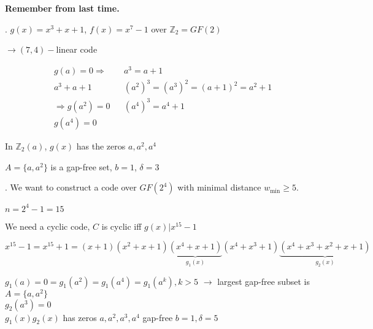 

\textbf{Remember from last time.}

\Example.
$g(x) = x^3 +x+1$, $f(x) = x^7-1$ over $\mathbb{Z}_2 = GF(2)$

$\to (7,4)-$linear code

\begin{align*}
  &g(a) = 0 \Rightarrow && a^3= a+1\\
  &a^3+a+1              &&(a^2)^3 = (a^3)^2 = (a+1)^2 = a^2+1\\
  &\Rightarrow g(a^2) = 0  && (a^4)^3 = a^4+1\\
  &g(a^4)=0
\end{align*}

In $\mathbb{Z}_2(a)$, $g(x)$ has the zeros $a,a^2,a^4$

$A = \{a,a^2\}$ is a gap-free set, $b=1$, $\delta =3$

\Example.
We want to construct a code over $GF(2^4)$ with minimal distance $w_{\min} \geq 5$.

$n=2^4-1=15$

We need a cyclic code, $C$ is cyclic iff $g(x)|x^{15}-1$

$x^{15}-1 = x^{15}+1 = (x+1)(x^2+x+1)\underbrace{(x^4+x+1)}_{g_1(x)}(x^4+x^3+1)\underbrace{(x^4+x^3+x^2+x+1)}_{g_2(x)}$

$g_1(a)=0= g_1(a^2)=g_1(a^4) = g_1(a^k), k>5$ $\to$ largest gap-free subset is $A=\{a,a^2\}$\\
$g_2(a^3)=0$ \\
$g_1(x)g_2(x)$ has zeros $a,a^2,a^3,a^4$ gap-free $b=1, \delta=5$

